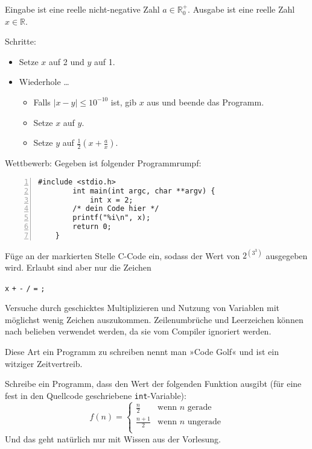 \documentclass{uebungszettel}
\begin{document}
\begin{aufg}
    \begin{algorithm}[H]
        \caption{}
        Eingabe ist eine reelle nicht-negative Zahl $a \in \mathbb R_0^+$.
        Ausgabe ist eine reelle Zahl $x \in \mathbb R$.

        Schritte:
        \begin{itemize}
            \item
                Setze $x$ auf 2 und $y$ auf 1.
            \item
                Wiederhole …
                \begin{itemize}
                    \item 
                        Falls $|x - y| \leq 10^{-10}$ ist, gib $x$ aus und
                        beende das Programm.
                    \item
                        Setze $x$ auf $y$.
                    \item
                        Setze $y$ auf $\frac12 (x + \frac ax)$.
                \end{itemize}
        \end{itemize}
    \end{algorithm}
\end{aufg}

\begin{aufg}
    Wettbewerb: Gegeben ist folgender Programmrumpf:
    \begin{codelisting}
        \begin{lstlisting}[numbers=left,numberstyle=\tiny,frame=tlrb]
        #include <stdio.h>
        int main(int argc, char **argv) {
            int x = 2;
        /* dein Code hier */
        printf("%i\n", x);
        return 0;
    }
        \end{lstlisting}
    \end{codelisting}
    Füge an der markierten Stelle C-Code ein, sodass der Wert von $2^{\left(3^3\right)}$ ausgegeben wird. Erlaubt sind aber nur die Zeichen 
    \begin{center}
        \texttt x \quad \texttt + \quad \texttt - \quad \texttt * \quad \texttt / \quad \texttt = \quad \texttt ;
    \end{center}
    Versuche durch geschicktes Multiplizieren und Nutzung
    von Variablen mit möglichst wenig Zeichen auszukommen. Zeilenumbrüche und
    Leerzeichen können nach belieben verwendet werden, da sie vom
    Compiler ignoriert werden.

    Diese Art ein Programm zu schreiben nennt man »Code Golf« und ist ein
    witziger Zeitvertreib.
\end{aufg}

\begin{aufg}
Schreibe ein Programm, dass den Wert der folgenden Funktion ausgibt (für eine fest in den Quellcode geschriebene \verb|int|-Variable):
\[
	f(n) = \left\{ \begin{array}{ll}
	\frac{n}{2} & \text{wenn } n \text{ gerade} \\
	\frac{n+1}{2} & \text{wenn } n \text{ ungerade} \\
	\end{array}
	\right.
\]
Und das geht natürlich nur mit Wissen aus der Vorlesung.
\end{aufg}
\end{document}
